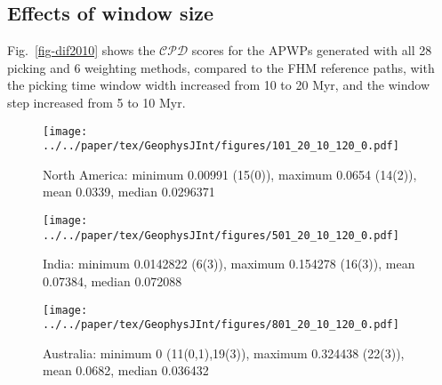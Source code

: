 \subsection{Effects of window size}

Fig.~\ref{fig-dif2010} shows the $\mathcal{CPD}$ scores for the APWPs generated
with all 28 picking and 6 weighting methods, compared to the FHM reference
paths, with the picking time window width increased from 10 to 20 Myr, and the
window step increased from 5 to 10 Myr.

\begin{figure*}
	\centering
	\begin{subfigure}{.96\textwidth}
		\texttt{[image: ../../paper/tex/GeophysJInt/figures/101\_20\_10\_120\_0.pdf]}
		\caption{North America: minimum 0.00991 (15(0)),
		maximum 0.0654 (14(2)), mean 0.0339, median 0.0296371}\label{fig-na-dif2010}
	\end{subfigure}
	\vspace{.1em}
	\begin{subfigure}{.96\textwidth}
		\texttt{[image: ../../paper/tex/GeophysJInt/figures/501\_20\_10\_120\_0.pdf]}
		\caption{India: minimum 0.0142822 (6(3)), maximum 0.154278 (16(3)),
		mean 0.07384, median 0.072088}\label{fig-in-dif2010}
	\end{subfigure}
	\vspace{.1em}
	\begin{subfigure}{.96\textwidth}
		\texttt{[image: ../../paper/tex/GeophysJInt/figures/801\_20\_10\_120\_0.pdf]}
		\caption{Australia: minimum 0 (11(0,1),19(3)), maximum
		0.324438 (22(3)), mean 0.0682, median 0.036432}\label{fig-au-dif2010}
	\end{subfigure}
	\caption[Differences of each plate's paleomagnetic APWPs versus its FHM
predicted APWP]{As Fig.~\ref{fig-dif}, here the paths are generated in 20 Myr
bin and 10 Myr step. The difference values less than one-standard-deviation
interval of the whole 168 values are colored in green, more than
one-standard-deviation interval colored in red. Compare the numbers of picked
paleopoles with those in Fig.~\ref{fig-dif}.}\label{fig-dif2010}
\end{figure*}


